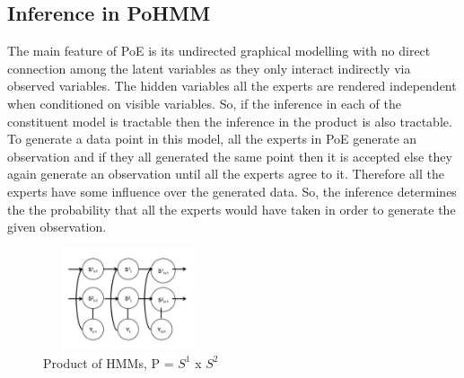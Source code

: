 \documentclass{sig-alternate}
\begin{document}

\subsection{Inference in PoHMM}

The main feature of PoE is its undirected graphical modelling with no direct connection among the latent variables as they only interact indirectly via observed variables. The hidden variables all the experts are rendered independent when conditioned on visible variables. So, if the inference in each of the constituent model is tractable then the inference in the product is also tractable. To generate a data point in this model, all the experts in PoE generate an observation and if they all generated the same point then it is accepted else they again generate an observation until all the experts agree to it. Therefore all the experts have some influence over the generated data. So, the inference determines the the probability that all the experts would have taken in order to generate the given observation. 

\begin{figure}[t]
\centering
\includegraphics[width=5cm,height=3cm]{pohmm1.jpg}
\caption{Product of HMMs, P = $S^{1}$ x $S^2$}
\label{fig:PoHMM}
\end{figure}

 
\end{document}
